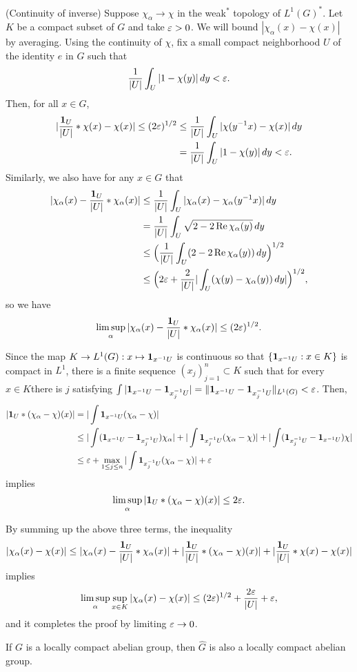\documentclass{../../small}
\begin{document}
\begin{pf}
(Continuity of inverse)
Suppose $\chi_\alpha\to\chi$ in the weak$^*$ topology of $L^1(G)^*$.
Let $K$ be a compact subset of $G$ and take $\varepsilon>0$.
We will bound $|\chi_\alpha(x)-\chi(x)|$ by averaging.
Using the continuity of $\chi$, fix a small compact neighborhood $U$ of the identity $e$ in $G$ such that
\[\frac1{|U|}\int_U|1-\chi(y)|\,dy<\varepsilon.\]
Then, for all $x\in G$,
\begin{align*}
|\frac{\mathbf{1}_U}{|U|}*\chi(x)-\chi(x)|\le(2\varepsilon)^{1/2}
&\le\frac1{|U|}\int_U|\chi(y^{-1}x)-\chi(x)|\,dy\\
&=\frac1{|U|}\int_U|1-\chi(y)|\,dy<\varepsilon.
\end{align*}
Similarly, we also have for any $x\in G$ that
\begin{align*}
|\chi_\alpha(x)-\frac{\mathbf{1}_U}{|U|}*\chi_\alpha(x)|
&\le\frac1{|U|}\int_U|\chi_\alpha(x)-\chi_\alpha(y^{-1}x)|\,dy\\
&=\frac1{|U|}\int_U\sqrt{2-2\operatorname{Re} \chi_\alpha(y)}\,dy\\
&\le\Bigl(\frac1{|U|}\int_U(2-2\operatorname{Re}\chi_\alpha(y))\,dy\Bigr)^{1/2}\\
&\le\Bigl(2\varepsilon+\frac2{|U|}|\int_U(\chi(y)-\chi_\alpha(y))\,dy|\Bigr)^{1/2},
\end{align*}
so we have
\[\limsup_\alpha|\chi_\alpha(x)-\frac{\mathbf{1}_U}{|U|}*\chi_\alpha(x)|\le(2\varepsilon)^{1/2}.\]

Since the map $K\to L^1(G):x\mapsto\mathbf{1}_{x^{-1}U}$ is continuous so that $\{\mathbf{1}_{x^{-1}U}:x\in K\}$ is compact in $L^1$, there is a finite sequence $(x_j)_{j=1}^n\subset K$ such that for every $x\in K$there is $j$ satisfying $\int|\mathbf{1}_{x^{-1}U}-\mathbf{1}_{x_j^{-1}U}|=\|\mathbf{1}_{x^{-1}U}-\mathbf{1}_{x_j^{-1}U}\|_{L^1(G)}<\varepsilon$.
Then,
\begin{align*}
|\mathbf{1}_U*(\chi_\alpha-\chi)(x)|
&=|\int\mathbf{1}_{x^{-1}U}(\chi_\alpha-\chi)|\\
&\le|\int(\mathbf{1}_{x^{-1}U}-\mathbf{1}_{x_j^{-1}U})\chi_\alpha|+|\int\mathbf{1}_{x_j^{-1}U}(\chi_\alpha-\chi)|+|\int(\mathbf{1}_{x_j^{-1}U}-\mathbf{1}_{x^{-1}U})\chi|\\
&\le\varepsilon+\max_{1\le j\le n}|\int\mathbf{1}_{x_j^{-1}U}(\chi_\alpha-\chi)|+\varepsilon
\end{align*}
implies
\[\limsup_\alpha|\mathbf{1}_U*(\chi_\alpha-\chi)(x)|\le2\varepsilon.\]

By summing up the above three terms, the inequality
\begin{align*}
|\chi_\alpha(x)-\chi(x)|\le|\chi_\alpha(x)-\frac{\mathbf{1}_U}{|U|}*\chi_\alpha(x)|+|\frac{\mathbf{1}_U}{|U|}*(\chi_\alpha-\chi)(x)|+|\frac{\mathbf{1}_U}{|U|}*\chi(x)-\chi(x)|
\end{align*}
implies
\[\limsup_\alpha\sup_{x\in K}|\chi_\alpha(x)-\chi(x)|\le(2\varepsilon)^{1/2}+\frac{2\varepsilon}{|U|}+\varepsilon,\]
and it completes the proof by limiting $\varepsilon\to0$.
\end{pf}
\begin{cor}
If $G$ is a locally compact abelian group, then $\hat G$ is also a locally compact abelian group.
\end{cor}
\end{document}
